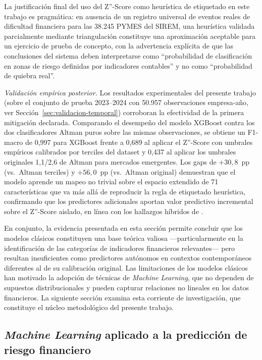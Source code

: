 \documentclass[12pt, letterpaper]{article}
\begin{document}
La justificaci\'on final del uso del Z''-Score como heur\'istica de etiquetado en este trabajo es pragm\'atica: en ausencia de un registro universal de eventos reales de dificultad financiera para las 38.245 PYMES del SIREM, una heur\'istica validada parcialmente mediante triangulaci\'on constituye una aproximaci\'on aceptable para un ejercicio de prueba de concepto, con la advertencia expl\'icita de que las conclusiones del sistema deben interpretarse como ``probabilidad de clasificaci\'on en zonas de riesgo definidas por indicadores contables'' y no como ``probabilidad de quiebra real''.

\textit{Validaci\'on emp\'irica posterior.} Los resultados experimentales del presente trabajo (sobre el conjunto de prueba 2023--2024 con 50.957 observaciones empresa-a\~no, ver Secci\'on~\ref{sec:validacion-temporal}) corroboran la efectividad de la primera mitigaci\'on declarada. Comparando el desempe\~no del modelo XGBoost contra los dos clasificadores Altman puros sobre las mismas observaciones, se obtiene un F1-macro de 0,997 para XGBoost frente a 0,689 al aplicar el Z''-Score con umbrales emp\'iricos calibrados por terciles del dataset y 0,437 al aplicar los umbrales originales 1,1/2,6 de Altman para mercados emergentes. Los gaps de $+30,8$~pp (vs.\ Altman terciles) y $+56,0$~pp (vs.\ Altman original) demuestran que el modelo aprende un mapeo no trivial sobre el espacio extendido de 71 caracter\'isticas que va m\'as all\'a de reproducir la regla de etiquetado heur\'istica, confirmando que los predictores adicionales aportan valor predictivo incremental sobre el Z''-Score aislado, en l\'inea con los hallazgos h\'ibridos de \citet{Wu2022}.

En conjunto, la evidencia presentada en esta secci\'on permite concluir que los modelos cl\'asicos constituyen una base te\'orica valiosa ---particularmente en la identificaci\'on de las categor\'ias de indicadores financieros relevantes--- pero resultan insuficientes como predictores aut\'onomos en contextos contempor\'aneos diferentes al de su calibraci\'on original. Las limitaciones de los modelos cl\'asicos han motivado la adopci\'on de t\'ecnicas de \textit{Machine Learning}, que no dependen de supuestos distribucionales y pueden capturar relaciones no lineales en los datos financieros. La siguiente secci\'on examina esta corriente de investigaci\'on, que constituye el n\'ucleo metodol\'ogico del presente trabajo.

\subsection{\textit{Machine Learning} aplicado a la predicci\'on de riesgo financiero}
\label{sec:ml}
\end{document}
